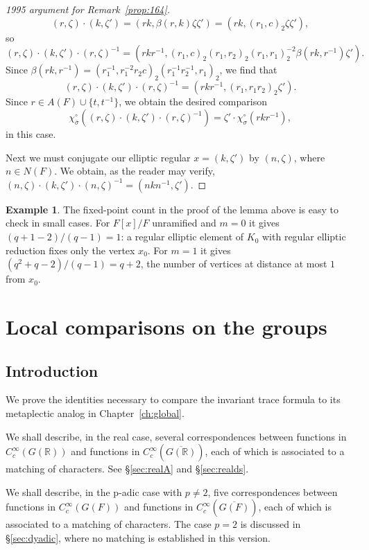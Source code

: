 \documentclass[12pt,letterpaper]{book}
\theoremstyle{plain}
\theoremstyle{definition}
\newtheorem{example}[theorem]{Example}
\theoremstyle{remark}
\theoremstyle{remark}
\begin{document}
\begin{proof}[1995 argument for Remark~\ref{prop:164}]
$$
(r,\zeta)\cdot (k,\zeta')
=(rk,\beta (r,k)\zeta\zeta' )=(rk,(r_1,c)_2\zeta\zeta' ),
$$
so
$$
(r,\zeta)\cdot (k,\zeta')\cdot ( r,\zeta)^{-1}
=(rkr^{-1}, (r_1,c)_2(r_1,r_2)_2(r_1,r_1)_2^{-2}\beta (rk, r^{-1})\zeta' ).
$$
Since
$\beta (rk, r^{-1})=(r_1^{-1},r_1^{-2}r_2c)_2(r_1^{-1}r_2^{-1},r_1)_2$,
we find that
$$
(r,\zeta)\cdot (k,\zeta')\cdot ( r,\zeta)^{-1}
=(rkr^{-1}, (r_1,r_1r_2)_2\zeta' ).
$$
Since $r\in A(F)\cup \{t,t^{-1}\}$, we obtain the desired comparison
$$
\chi_{\overline{\sigma}}^\circ ((r,\zeta)
\cdot (k,\zeta')\cdot ( r,\zeta)^{-1})
=\zeta'\cdot \chi_{\sigma}^\circ (rkr^{-1}),
$$
in this case.
\par
Next we must conjugate our elliptic regular $x=(k,\zeta')$ by
$(n,\zeta)$, where $n\in N(F)$. We obtain, as the reader may verify,
$(n,\zeta)\cdot (k,\zeta')\cdot (n,\zeta)^{-1}=(nkn^{-1},\zeta')$.
\end{proof}



\begin{example}
The fixed-point count in the proof of the lemma above is easy to check in small cases.
For $F[x]/F$ unramified and $m=0$ it gives
$(q+1-2)/(q-1)=1$: a regular elliptic element of $K_0$ with regular
elliptic reduction fixes only the vertex $x_0$. For $m=1$ it gives
$(q^2+q-2)/(q-1)=q+2$, the number of vertices at distance at most $1$ from
$x_0$.
\end{example}

\chapter{Local comparisons on the groups}\label{ch:local}

\section{Introduction}
We prove the identities necessary to compare the
invariant trace formula to its metaplectic analog in Chapter~\ref{ch:global}.

We shall describe, in the real case, several
correspondences between functions in
$C_c^\infty(G({\mathbb{R}}))$ and functions in
$C_c^\infty(\overline{G({\mathbb{R}})})$, each of which is associated
to a matching of characters. See \S\ref{sec:realA} and
\S\ref{sec:realds}.

We shall describe, in the p-adic case with $p\not= 2$,
five correspondences between functions in
$C_c^\infty(G(F))$ and functions in
$C_c^\infty(\overline{G(F)})$, each of which is associated
to a matching of characters. The case $p=2$ is discussed in
\S\ref{sec:dyadic}, where no matching is established in this version.
\end{document}
